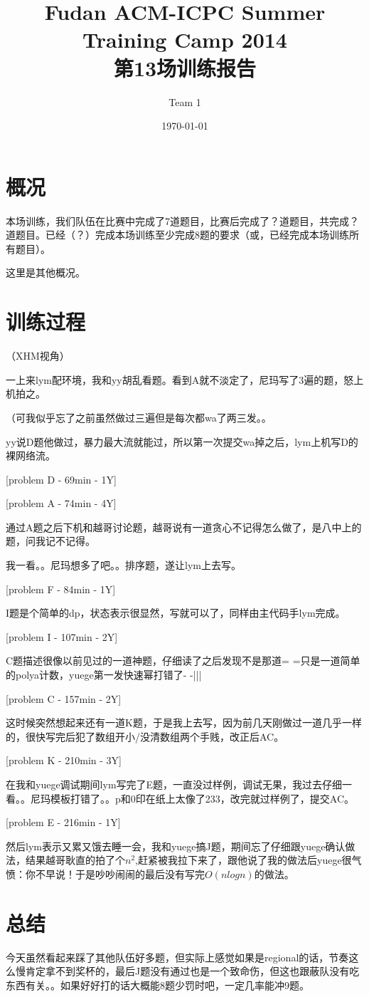 \documentclass[a4paper, 11pt, nofonts, nocap, fancyhdr]{ctexart}
\title{Fudan ACM-ICPC Summer Training Camp 2014\\第13场训练报告}
\author{Team 1}
\date{\today}
\begin{document}
\maketitle

\section{概况}

本场训练，我们队伍在比赛中完成了7道题目，比赛后完成了？道题目，共完成？道题目。已经（？）完成本场训练至少完成8题的要求（或，已经完成本场训练所有题目）。

这里是其他概况。

\section{训练过程}

（XHM视角）

一上来lym配环境，我和yy胡乱看题。看到A就不淡定了，尼玛写了3遍的题，怒上机拍之。

（可我似乎忘了之前虽然做过三遍但是每次都wa了两三发。。

yy说D题他做过，暴力最大流就能过，所以第一次提交wa掉之后，lym上机写D的裸网络流。

[problem D - 69min - 1Y]

[problem A - 74min - 4Y]

通过A题之后下机和越哥讨论题，越哥说有一道贪心不记得怎么做了，是八中上的题，问我记不记得。

我一看。。尼玛想多了吧。。排序题，遂让lym上去写。

[problem F - 84min - 1Y]

I题是个简单的dp，状态表示很显然，写就可以了，同样由主代码手lym完成。

[problem I - 107min - 2Y]

C题描述很像以前见过的一道神题，仔细读了之后发现不是那道= =只是一道简单的polya计数，yuege第一发快速幂打错了- -|||

[problem C - 157min - 2Y]

这时候突然想起来还有一道K题，于是我上去写，因为前几天刚做过一道几乎一样的，很快写完后犯了数组开小/没清数组两个手贱，改正后AC。

[problem K - 210min - 3Y]

在我和yuege调试期间lym写完了E题，一直没过样例，调试无果，我过去仔细一看。。尼玛模板打错了。。p和0印在纸上太像了233，改完就过样例了，提交AC。

[problem E - 216min - 1Y]

然后lym表示又累又饿去睡一会，我和yuege搞J题，期间忘了仔细跟yuege确认做法，结果越哥耿直的拍了个$n^2$,赶紧被我拉下来了，跟他说了我的做法后yuege很气愤：你不早说！于是吵吵闹闹的最后没有写完$O(nlogn)$的做法。

\section{总结}

今天虽然看起来踩了其他队伍好多题，但实际上感觉如果是regional的话，节奏这么慢肯定拿不到奖杯的，最后J题没有通过也是一个致命伤，但这也跟蔽队没有吃东西有关。。如果好好打的话大概能8题少罚时吧，一定几率能冲9题。
\end{document}
